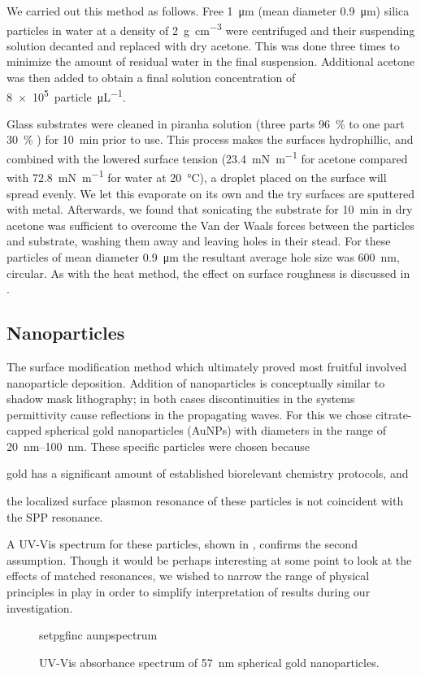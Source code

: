 We carried out this method as follows.  Free \SI{1}{\micro\meter} (mean
diameter \SI{0.9}{\micro\meter}) silica particles in water at a density of
\SI{2}{\gram\per\centi\meter\cubed} were centrifuged and their suspending
solution decanted and replaced with dry acetone.  This was done three times
to minimize the amount of residual water in the final suspension.
Additional acetone was then added to obtain a final solution concentration
of \SI{8e5}{particle\per\micro\liter}.  

Glass substrates were cleaned in piranha solution (three parts
\SI{96}{\percent}  to one part \SI{30}{\percent} ) for
\SI{10}{\minute} prior to use.  This process makes the surfaces
hydrophillic, and combined with the lowered surface tension
(\SI{23.4}{\milli\newton\per\meter} for acetone compared with
\SI{72.8}{\milli\newton\per\meter} for water at \SI{20}{\celsius}), a
droplet placed on the surface will spread evenly.  We let this evaporate on
its own and the try surfaces are sputtered with metal.  Afterwards, we
found that sonicating the substrate for \SI{10}{\minute} in dry acetone was
sufficient to overcome the Van der Waals forces between the particles and
substrate, washing them away and leaving holes in their stead.  For these
particles of mean diameter \SI{0.9}{\micro\meter} the resultant average
hole size was \SI{600}{\nano\meter}, circular.  As with the heat method,
the effect on surface roughness is discussed in
.

\subsection{Nanoparticles}
The surface modification method which ultimately proved most fruitful
involved nanoparticle deposition.  Addition of nanoparticles is
conceptually similar to shadow mask lithography; in both cases
discontinuities in the systems permittivity cause reflections in the
propagating waves.  For this we chose citrate-capped spherical gold
nanoparticles (AuNPs) with diameters in the range of
\SIrange{20}{100}{\nano\meter}.  
These specific particles were chosen because
\begin{inparaenum}[(a)]
\item gold has a significant amount of established biorelevant chemistry
				protocols, and
\item the localized surface plasmon resonance of these particles is not
				coincident with the SPP resonance.
\end{inparaenum}
A UV-Vis spectrum for these particles, shown in ,
confirms the second assumption.  Though it would be perhaps interesting at
some point to look at the effects of matched resonances, we wished to
narrow the range of physical principles in play in order to simplify
interpretation of results during our investigation.
\begin{figure}[ht]
 \centering
 {setpgfinc}
 {aunpspectrum}
 \caption{UV-Vis absorbance spectrum of \SI{57}{\nano\meter} spherical gold
 nanoparticles.}
 \label{fig:aunpspectrum}
\end{figure}

